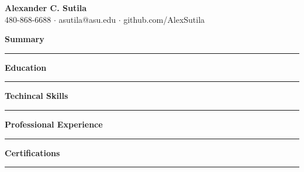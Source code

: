 \documentclass{article}
\begin{document}
\hspace{0.7em}\parbox[c]{0.5\linewidth}{
    \LARGE{\textbf{Alexander C. Sutila}}\\
    \normalsize{480-868-6688 $\cdot$ asutila@asu.edu $\cdot$ github.com/AlexSutila}
}
\hfill {}
\vspace{0.5em}

\noindent\large{\textbf{Summary}}\\[-0.6em]
\noindent\rule{\textwidth}{0.4pt}
\begin{normalsize}
    
\end{normalsize}
\vspace{0.9em}


\noindent\large{\textbf{Education}}\\[-0.6em]
\noindent\rule{\textwidth}{0.4pt}
\begin{normalsize}
    
\end{normalsize}
\vspace{0.7em}


\noindent\large{\textbf{Techincal Skills}}\\[-0.6em]
\noindent\rule{\textwidth}{0.4pt}
\begin{normalsize}
    
\end{normalsize}
\vspace{0.7em}


\noindent\large{\textbf{Professional Experience}}\\[-0.6em]
\noindent\rule{\textwidth}{0.4pt}
\begin{normalsize}
    
\end{normalsize}
\vspace{0.7em}


\noindent\large{\textbf{Certifications}}\\[-0.6em]
\noindent\rule{\textwidth}{0.4pt}
\begin{normalsize}
    
\end{normalsize}
\vspace{0.7em}
\end{document}
